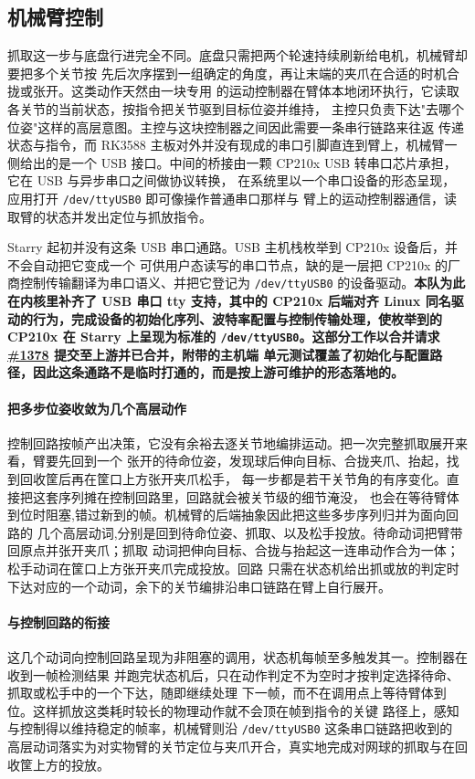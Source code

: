\subsection{机械臂控制}\label{sec:arm}

抓取这一步与底盘行进完全不同。底盘只需把两个轮速持续刷新给电机，机械臂却要把多个关节按
先后次序摆到一组确定的角度，再让末端的夹爪在合适的时机合拢或张开。这类动作天然由一块专用
的运动控制器在臂体本地闭环执行，它读取各关节的当前状态，按指令把关节驱到目标位姿并维持，
主控只负责下达"去哪个位姿"这样的高层意图。主控与这块控制器之间因此需要一条串行链路来往返
传递状态与指令，而 RK3588 主板对外并没有现成的串口引脚直连到臂上，机械臂一侧给出的是一个
USB 接口。中间的桥接由一颗 CP210x USB 转串口芯片承担，它在 USB 与异步串口之间做协议转换，
在系统里以一个串口设备的形态呈现，应用打开 \texttt{/dev/ttyUSB0} 即可像操作普通串口那样与
臂上的运动控制器通信，读取臂的状态并发出定位与抓放指令。


Starry 起初并没有这条 USB 串口通路。USB 主机栈枚举到 CP210x 设备后，并不会自动把它变成一个
可供用户态读写的串口节点，缺的是一层把 CP210x 的厂商控制传输翻译为串口语义、并把它登记为
\texttt{/dev/ttyUSB0} 的设备驱动。\textbf{本队为此在内核里补齐了 USB 串口 tty 支持，其中的 CP210x
后端对齐 Linux 同名驱动的行为，完成设备的初始化序列、波特率配置与控制传输处理，使枚举到的
CP210x 在 Starry 上呈现为标准的 \texttt{/dev/ttyUSB0}。}\textbf{这部分工作以合并请求
\href{https://github.com/rcore-os/tgoskits/pull/1378}{\#1378} 提交至上游并已合并，附带的主机端
单元测试覆盖了初始化与配置路径，因此这条通路不是临时打通的，而是按上游可维护的形态落地的。}

\paragraph{把多步位姿收敛为几个高层动作}
控制回路按帧产出决策，它没有余裕去逐关节地编排运动。把一次完整抓取展开来看，臂要先回到一个
张开的待命位姿，发现球后伸向目标、合拢夹爪、抬起，找到回收筐后再在筐口上方张开夹爪松手，
每一步都是若干关节角的有序变化。直接把这套序列摊在控制回路里，回路就会被关节级的细节淹没，
也会在等待臂体到位时阻塞,错过新到的帧。机械臂的后端抽象因此把这些多步序列归并为面向回路的
几个高层动词,分别是回到待命位姿、抓取、以及松手投放。待命动词把臂带回原点并张开夹爪；抓取
动词把伸向目标、合拢与抬起这一连串动作合为一体；松手动词在筐口上方张开夹爪完成投放。回路
只需在状态机给出抓或放的判定时下达对应的一个动词，余下的关节编排沿串口链路在臂上自行展开。

\paragraph{与控制回路的衔接}
这几个动词向控制回路呈现为非阻塞的调用，状态机每帧至多触发其一。控制器在收到一帧检测结果
并跑完状态机后，只在动作判定不为空时才按判定选择待命、抓取或松手中的一个下达，随即继续处理
下一帧，而不在调用点上等待臂体到位。这样抓放这类耗时较长的物理动作就不会顶在帧到指令的关键
路径上，感知与控制得以维持稳定的帧率，机械臂则沿 \texttt{/dev/ttyUSB0} 这条串口链路把收到的
高层动词落实为对实物臂的关节定位与夹爪开合，真实地完成对网球的抓取与在回收筐上方的投放。
